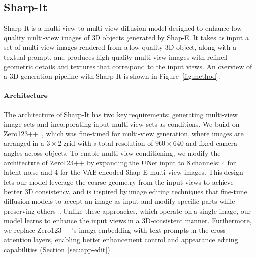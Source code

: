 \subsection{Sharp-It}%
Sharp-It is a multi-view to multi-view diffusion model designed to enhance low-quality multi-view images of 3D objects generated by Shap-E. It takes as input a set of multi-view images rendered from a low-quality 3D object, along with a textual prompt, and produces high-quality multi-view images with refined geometric details and textures that correspond to the input views.
An overview of a 3D generation pipeline with Sharp-It is shown in Figure~\ref{fig:method}.

\paragraph{Architecture}
The architecture of Sharp-It has two key requirements: generating multi-view image sets and incorporating input multi-view sets as conditions. We build on Zero123++~\cite{shi2023zero123singleimageconsistent, xu2024instantmesh}, which was fine-tuned for multi-view generation, where images are arranged in a $3\times2$ grid with a total resolution of $960\times640$ and fixed camera angles across objects.
%
To enable multi-view conditioning, we modify the architecture of Zero123++ by expanding the UNet input to 8 channels: 4 for latent noise and 4 for the VAE-encoded Shap-E multi-view images. This design lets our model leverage the coarse geometry from the input views to achieve better 3D consistency, and is inspired by image editing techniques that fine-tune diffusion models to accept an image as input and modify specific parts while preserving others~\cite{brooks2022instructpix2pix, rombach2022highresolutionimagesynthesislatent, yang2022paint}. Unlike these approaches, which operate on a single image, our model learns to enhance the input views in a 3D-consistent manner. 
Furthermore, we replace Zero123++'s image embedding with text prompts in the cross-attention layers, enabling better enhancement control and appearance editing capabilities (Section~\ref{sec:app-edit}).

